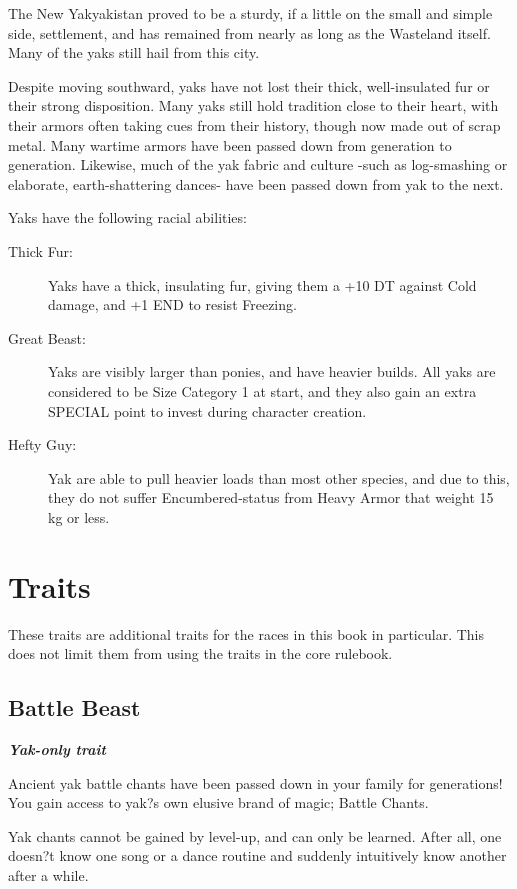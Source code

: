 \documentclass[11pt,a4paper,twocolumn]{book}
\begin{document}
	The New Yakyakistan proved to be a sturdy, if a little on the small and simple side, settlement, and has remained from nearly as long as the Wasteland itself. Many of the yaks still hail from this city.
	
	Despite moving southward, yaks have not lost their thick, well-insulated fur or their strong disposition. Many yaks still hold tradition close to their heart, with their armors often taking cues from their history, though now made out of scrap metal. Many wartime armors have been passed down from generation to generation. Likewise, much of the yak fabric and culture -such as log-smashing or elaborate, earth-shattering dances- have been passed down from yak to the next.
	
	Yaks have the following racial abilities:
	\begin{description}
		\item[Thick Fur:] Yaks have a thick, insulating fur, giving them a +10 DT against Cold damage, and +1 END to resist Freezing.
		\item[Great Beast:] Yaks are visibly larger than ponies, and have heavier builds. All yaks are considered to be Size Category 1 at start, and they also gain an extra SPECIAL point to invest during character creation.
		\item[Hefty Guy:] Yak are able to pull heavier loads than most other species, and due to this, they do not suffer Encumbered-status from Heavy Armor that weight 15 kg or less.
	\end{description}

	\clearpage
	
	\chapter{Traits}
	
	These traits are additional traits for the races in this book in particular. This does not limit them from using the traits in the core rulebook.
	
	\section*{Battle Beast}
	\emph{\textbf{Yak-only trait}}
	
	Ancient yak battle chants have been passed down in your family for generations! You gain access to yak?s own elusive brand of magic; Battle Chants.
	
	Yak chants cannot be gained by level-up, and can only be learned. After all, one doesn?t know one song or a dance routine and suddenly intuitively know another after a while.
	
\end{document}
